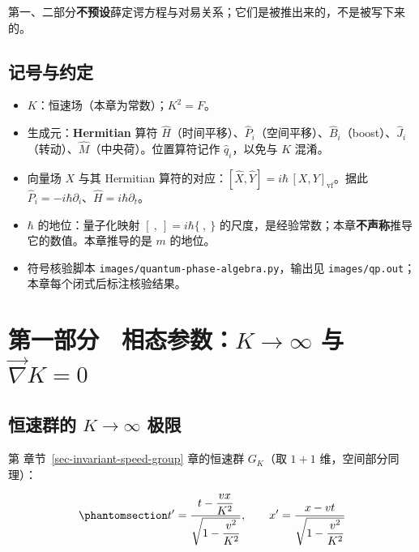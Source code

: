 \documentclass[
  chinese,
  a4paper,
  UTF8,
  12pt,
  oneside,
  openany]{ctexbook}
\providecommand{\tightlist}{%
  \setlength{\itemsep}{0pt}\setlength{\parskip}{0pt}}
\theoremstyle{plain}
\theoremstyle{plain}
\theoremstyle{plain}
\theoremstyle{definition}
\theoremstyle{plain}
\theoremstyle{plain}
\theoremstyle{remark}
\begin{document}
第一、二部分\textbf{不预设}薛定谔方程与对易关系；它们是被推出来的，不是被写下来的。

\subsection{记号与约定}\label{ux8bb0ux53f7ux4e0eux7ea6ux5b9a}

\begin{itemize}
\tightlist
\item
  \(K\)：恒速场（本章为常数）；\(K^{2}=F\)。
\item
  生成元：\textbf{Hermitian} 算符
  \(\hat H\)（时间平移）、\(\hat P_i\)（空间平移）、\(\hat B_i\)（boost）、\(\hat J_i\)（转动）、\(\hat M\)（中央荷）。位置算符记作
  \(\hat q_i\)，以免与 \(K\) 混淆。
\item
  向量场 \(X\) 与其 Hermitian
  算符的对应：\([\hat X,\hat Y]=i\hbar\,[X,Y]_{\text{vf}}\)。据此
  \(\hat P_i=-i\hbar\partial_i\)、\(\hat H=i\hbar\partial_t\)。
\item
  \(\hbar\) 的地位：量子化映射 \([\ ,\ ]=i\hbar\{\ ,\ \}\)
  的尺度，是经验常数；本章\textbf{不声称}推导它的数值。本章推导的是
  \(m\) 的地位。
\item
  符号核验脚本 \texttt{images/quantum-phase-algebra.py}，输出见
  \texttt{images/qp.out}；本章每个闭式后标注核验结果。
\end{itemize}

\section{\texorpdfstring{第一部分　相态参数：\(K\to\infty\) 与
\(\vec\nabla K=0\)}{第一部分　相态参数：K\textbackslash to\textbackslash infty 与 \textbackslash vec\textbackslash nabla K=0}}\label{sec-qp-part1}

\subsection{\texorpdfstring{恒速群的 \(K\to\infty\)
极限}{恒速群的 K\textbackslash to\textbackslash infty 极限}}\label{ux6052ux901fux7fa4ux7684-ktoinfty-ux6781ux9650}

第 章节~\ref{sec-invariant-speed-group} 章的恒速群 \(G_K\)（取 \(1+1\)
维，空间部分同理）：

\begin{equation}\protect\phantomsection\label{eq-qp-GK}{
t'=\frac{t-\dfrac{vx}{K^{2}}}{\sqrt{1-\dfrac{v^{2}}{K^{2}}}},\qquad
x'=\frac{x-vt}{\sqrt{1-\dfrac{v^{2}}{K^{2}}}}
}\end{equation}
\end{document}
